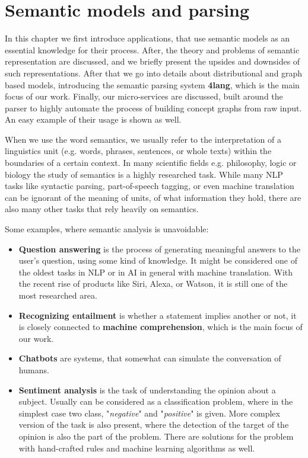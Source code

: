 \chapter{Semantic models and parsing}
\label{chap:semanticparsing}

In this chapter we first introduce applications, that use semantic models as an essential knowledge for their process. After, the theory and problems of semantic representation are discussed, and we briefly present the upsides and downsides of such representations. After that we go into details about distributional and graph based models, introducing the semantic parsing system \textbf{4lang}, which is the main focus of our work. Finally, our micro-services are discussed, built around the parser to highly automate the process of building concept graphs from raw input. An easy example of their usage is shown as well.

When we use the word semantics, we usually refer to the interpretation of a linguistics unit (e.g. words, phrases, sentences, or whole texts) within the boundaries of a certain context. In many scientific fields e.g. philosophy, logic or biology the study of semantics is a highly researched task. While many NLP tasks like syntactic parsing, part-of-speech tagging, or even machine translation can be ignorant of the meaning of units, of what information they hold, there are also many other tasks that rely heavily on semantics.

Some examples, where semantic analysis is unavoidable:
\begin{itemize}
	\item \textbf{Question answering} is the process of generating meaningful answers to the user's question, using some kind of knowledge. It might be considered one of the oldest tasks in NLP or in AI in general with machine translation. With the recent rise of products like Siri, Alexa, or Watson, it is still one of the most researched area.
	\item \textbf{Recognizing entailment} is whether a statement implies another or not, it is closely connected to \textbf{machine comprehension}, which is the main focus of our work.
	\item \textbf{Chatbots} are systems, that somewhat can simulate the conversation of humans.
	\item \textbf{Sentiment analysis} is the task of understanding the opinion about a subject. Usually can be considered as a classification problem, where in the simplest case two class, "\textit{negative}" and "\textit{positive}" is given. More complex version of the task is also present, where the detection of the target of the opinion is also the part of the problem. There are solutions for the problem with hand-crafted rules and machine learning algorithms as well.  
\end{itemize}

